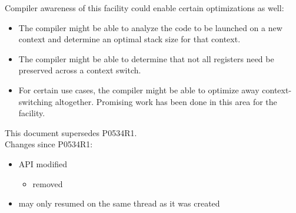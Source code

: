 \documentclass[fontsize=10pt,paper=A4,pagesize,DIV=15]{scrartcl}
\begin{document}
Compiler awareness of this facility could enable certain optimizations as
well:

\begin{itemize}
  \item The compiler might be able to analyze the code to be launched on a new
    \cc context and determine an optimal stack size for that context.
  \item The compiler might be able to determine that not all registers need be
    preserved across a context switch.
  \item For certain use cases, the compiler might be able to optimize away
    context-switching altogether. Promising work has been done in this area
    for the \coawait facility.\cite{N4649}
\end{itemize}

This document supersedes P0534R1.\cite{P0534R1}\\
\newline
Changes since P0534R1:

\begin{itemize}
    \item API modified
    \begin{itemize}
        \item {} removed
    \end{itemize}
    \item \cont may only resumed on the same thread as it was created
\end{itemize}














\end{document}
